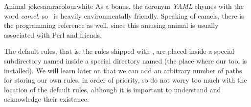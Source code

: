 \begin{messagebox}{Animal jokes}{araracolour}{\icok}{white}
As a bonus, the acronym \emph{YAML} rhymes with the word \emph{camel}, so \arara\ is heavily environmentally friendly. Speaking of camels, there is the programming reference as well, since this amusing animal is usually associated with Perl and friends.
\end{messagebox}

The default rules, that is, the rules shipped with \arara, are placed inside a special subdirectory named  inside a special directory named  (the place where our tool is installed). We will learn later on that we can add an arbitrary number of paths for storing our own rules, in order of priority, so do not worry too much with the location of the default rules, although it is important to understand and acknowledge their existance.

